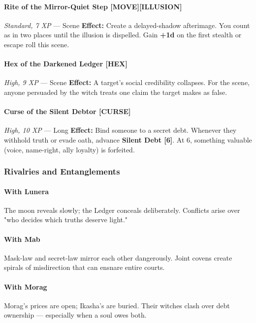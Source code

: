 \documentclass[11pt]{book}
\begin{document}
\paragraph{Rite of the Mirror-Quiet Step [MOVE][ILLUSION]}
\emph{Standard, 7 XP} --- Scene  
\textbf{Effect:} Create a delayed-shadow afterimage.  
You count as in two places until the illusion is dispelled.  
Gain \textbf{+1d} on the first stealth or escape roll this scene.

\paragraph{Hex of the Darkened Ledger [HEX]}
\emph{High, 9 XP} --- Scene  
\textbf{Effect:} A target's social credibility collapses.  
For the scene, anyone persuaded by the witch treats one claim the target makes as false.

\paragraph{Curse of the Silent Debtor [CURSE]}
\emph{High, 10 XP} --- Long  
\textbf{Effect:} Bind someone to a secret debt.  
Whenever they withhold truth or evade oath, advance \textbf{Silent Debt [6]}.  
At 6, something valuable (voice, name-right, ally loyalty) is forfeited.

\subsubsection{Rivalries and Entanglements}

\paragraph{With Lunera}
The moon reveals slowly; the Ledger conceals deliberately.  
Conflicts arise over "who decides which truths deserve light."

\paragraph{With Mab}
Mask-law and secret-law mirror each other dangerously.  
Joint covens create spirals of misdirection that can ensnare entire courts.

\paragraph{With Morag}
Morag's prices are open; Ikasha's are buried.  
Their witches clash over debt ownership --- especially when a soul owes both.
\end{document}
